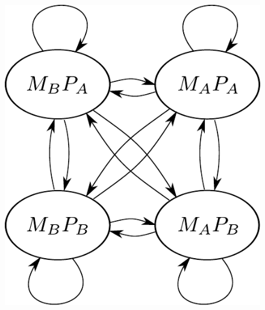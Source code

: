 \begin{figure}[h]
{\begin{minipage}[b]{0.45\textwidth}
		\includegraphics[height=0.2\textheight]{figures/NOR-HMM}
		\vspace{8pt}
	\end{minipage}	
}


\end{figure}
